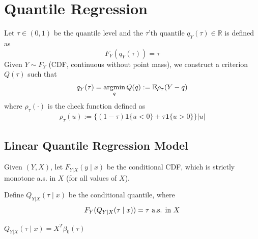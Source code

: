 \documentclass[11pt]{elegantbook}
\newcommand{\argmin}{\operatornamewithlimits{argmin}}
\begin{document}
\section{Quantile Regression}
Let $\tau\in(0,1)$ be the quantile level and the $\tau$'th quantile $q_Y(\tau)\in \mathbb{R}$ is defined as $$F_Y(q_Y(\tau))=\tau$$
Given $Y\sim F_Y$ (CDF, continuous without point mass), we construct a criterion $Q(\tau)$ such that
\begin{equation}
    \begin{aligned}
        q_Y(\tau)=\argmin_q Q(q):=\mathbb{E}\rho_\tau(Y-q)
    \end{aligned}
    \nonumber
\end{equation}
where $\rho_\tau(\cdot)$ is the check function defined as
\begin{equation}
    \begin{aligned}
        \rho_\tau(u):=\{(1-\tau)\mathbf{1}\{u<0\}+\tau\mathbf{1}\{u>0\}\}|u|
    \end{aligned}
    \nonumber
\end{equation}

\subsection{Linear Quantile Regression Model}
Given $(Y,X)$, let $F_{Y|X}(y\mid x)$ be the conditional CDF, which is strictly monotone a.s. in $X$ (for all values of $X$).

Define $Q_{Y|X}(\tau\mid x)$ be the conditional quantile, where
\begin{equation}
    \begin{aligned}
        F_Y(Q_{Y|X}(\tau\mid x))=\tau \textnormal{ a.s. in $X$}
    \end{aligned}
    \nonumber
\end{equation}

\begin{definition}
\normalfont
    $Q_{Y|X}(\tau\mid x)=X^T\beta_0(\tau)$
\end{definition}
\end{document}
